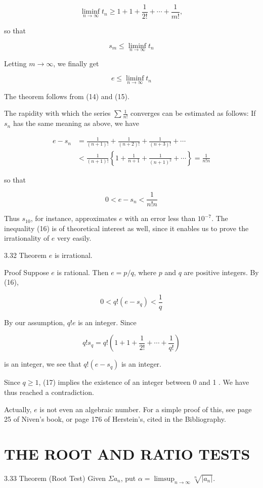\documentclass[10pt]{article}
\begin{document}
$$
\liminf _{n \rightarrow \infty} t_{n} \geq 1+1+\frac{1}{2 !}+\cdots+\frac{1}{m !},
$$

so that

$$
s_{m} \leq \liminf _{n \rightarrow \infty} t_{n}
$$

Letting $m \rightarrow \infty$, we finally get

$$
e \leq \liminf _{n \rightarrow \infty} t_{n}
$$

The theorem follows from (14) and (15).

The rapidity with which the series $\sum \frac{1}{n !}$ converges can be estimated as follows: If $s_{n}$ has the same meaning as above, we have

$$
\begin{aligned}
e-s_{n} & =\frac{1}{(n+1) !}+\frac{1}{(n+2) !}+\frac{1}{(n+3) !}+\cdots \\
& <\frac{1}{(n+1) !}\left\{1+\frac{1}{n+1}+\frac{1}{(n+1)^{2}}+\cdots\right\}=\frac{1}{n ! n}
\end{aligned}
$$

so that

$$
0<e-s_{n}<\frac{1}{n ! n}
$$

Thus $s_{10}$, for instance, approximates $e$ with an error less than $10^{-7}$. The inequality (16) is of theoretical interest as well, since it enables us to prove the irrationality of $e$ very easily.

3.32 Theorem $e$ is irrational.

Proof Suppose $e$ is rational. Then $e=p / q$, where $p$ and $q$ are positive integers. By (16),

$$
0<q !\left(e-s_{q}\right)<\frac{1}{q}
$$

By our assumption, $q ! e$ is an integer. Since

$$
q ! s_{q}=q !\left(1+1+\frac{1}{2 !}+\cdots+\frac{1}{q !}\right)
$$

is an integer, we see that $q !\left(e-s_{q}\right)$ is an integer.

Since $q \geq 1$, (17) implies the existence of an integer between 0 and 1 . We have thus reached a contradiction.

Actually, $e$ is not even an algebraic number. For a simple proof of this, see page 25 of Niven's book, or page 176 of Herstein's, cited in the Bibliography.

\section{THE ROOT AND RATIO TESTS}
3.33 Theorem (Root Test) Given $\Sigma a_{n}$, put $\alpha=\limsup _{n \rightarrow \infty} \sqrt[n]{\left|a_{n}\right|}$.
\end{document}
